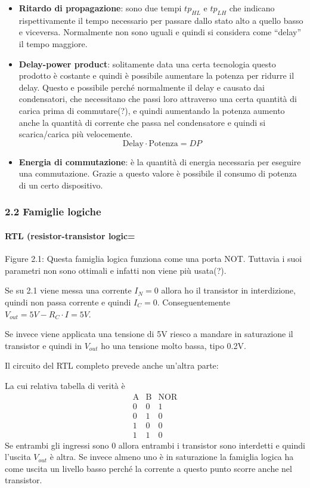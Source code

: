 \documentclass[
]{article}
\providecommand{\tightlist}{%
  \setlength{\itemsep}{0pt}\setlength{\parskip}{0pt}}
\begin{document}
\begin{itemize}
\tightlist
\item
  \textbf{Ritardo di propagazione}: sono due tempi \(tp_{HL}\) e
  \(tp_{LH}\) che indicano rispettivamente il tempo necessario per
  passare dallo stato alto a quello basso e viceversa. Normalmente non
  sono uguali e quindi si considera come ``delay'' il tempo maggiore.
\item
  \textbf{Delay-power product}: solitamente data una certa tecnologia
  questo prodotto è costante e quindi è possibile aumentare la potenza
  per ridurre il delay. Questo e possibile perché normalmente il delay e
  causato dai condensatori, che necessitano che passi loro attraverso
  una certa quantità di carica prima di commutare(?), e quindi
  aumentando la potenza aumento anche la quantità di corrente che passa
  nel condensatore e quindi si scarica/carica più velocemente.
  \[\text{Delay}\cdot\text{Potenza}=DP\]
\item
  \textbf{Energia di commutazione}: è la quantità di energia necessaria
  per eseguire una commutazione. Grazie a questo valore è possibile il
  consumo di potenza di un certo dispositivo.
\end{itemize}

\subsubsection{2.2 Famiglie logiche}\label{famiglie-logiche}

\paragraph{RTL (resistor-transistor
logic=}\label{rtl-resistor-transistor-logic}

Figure 2.1: Questa famiglia logica funziona come una porta NOT. Tuttavia
i suoi parametri non sono ottimali e infatti non viene più usata(?).

Se su 2.1 viene messa una corrente \(I_{N}=0\) allora ho il transistor
in interdizione, quindi non passa corrente e quindi \(I_{C}=0\).
Conseguentemente \(V_{out}=5V-R_{C}\cdot I=5V\).

Se invece viene applicata una tensione di 5V riesco a mandare in
saturazione il transistor e quindi in \(V_{out}\) ho una tensione molto
bassa, tipo 0.2V.

Il circuito del RTL completo prevede anche un'altra parte:

La cui relativa tabella di verità è \[
\begin{array}{cc|c}\text{A}&\text{B}&\text{NOR}\\\hline0&0&1\\0&1&0\\1&0&0\\1&1&0\end{array}
\] Se entrambi gli ingressi sono 0 allora entrambi i transistor sono
interdetti e quindi l'uscita \(V_{out}\) è altra. Se invece almeno uno è
in saturazione la famiglia logica ha come uscita un livello basso perché
la corrente a questo punto scorre anche nel transistor.
\end{document}
